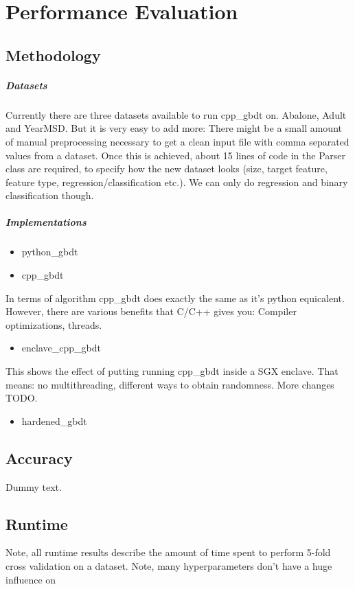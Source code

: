 \chapter{Performance Evaluation}

\section{Methodology}

\paragraph{Datasets}
Currently there are three datasets available to run cpp\_gbdt on. Abalone, Adult and YearMSD. But it is very easy to add more: There might be a small amount of manual preprocessing necessary to get a clean input file with comma separated values from a dataset. Once this is achieved, about 15 lines of code in the Parser class are required, to specify how the new dataset looks (size, target feature, feature type, regression/classification etc.). We can only do regression and binary classification though.

\paragraph{Implementations}

\begin{itemize}
    \item python\_gbdt
\end{itemize}

\begin{itemize}
    \item cpp\_gbdt
\end{itemize}

In terms of algorithm cpp\_gbdt does exactly the same as it's python equicalent. However, there are various benefits that C/C++ gives you: Compiler optimizations, threads.

\begin{itemize}
    \item enclave\_cpp\_gbdt
\end{itemize}

This shows the effect of putting running cpp\_gbdt inside a SGX enclave. That means: no multithreading, different ways to obtain randomness. More changes TODO.

\begin{itemize}
    \item hardened\_gbdt
\end{itemize}

\section{Accuracy}

Dummy text.

\section{Runtime}

Note, all runtime results describe the amount of time spent to perform 5-fold cross validation on a dataset.
Note, many hyperparameters don't have a huge influence on 


